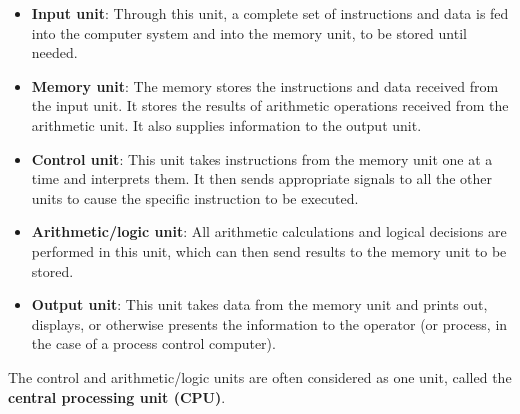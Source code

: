     \begin{itemize}
      \item \textbf{Input unit}: Through this unit, a complete set of instructions and data
        is fed into the computer system and into the memory unit, to be stored until
        needed.
      \item \textbf{Memory unit}: The memory stores the instructions and data received from
        the input unit. It stores the results of arithmetic operations received from
        the arithmetic unit. It also supplies information to the output unit.
      \item \textbf{Control unit}: This unit takes instructions from the memory unit one
        at a time and interprets them. It then sends appropriate signals to all the
        other units to cause the specific instruction to be executed.
      \item \textbf{Arithmetic/logic unit}: All arithmetic calculations and logical
        decisions are performed in this unit, which can then send results to the memory
        unit to be stored.
      \item \textbf{Output unit}: This unit takes data from the memory unit and prints out,
        displays, or otherwise presents the information to the operator (or process,
        in the case of a process control computer).
    \end{itemize}
    \par The control and arithmetic/logic units are often considered as one unit, called the
    \textbf{central processing unit (CPU)}.
